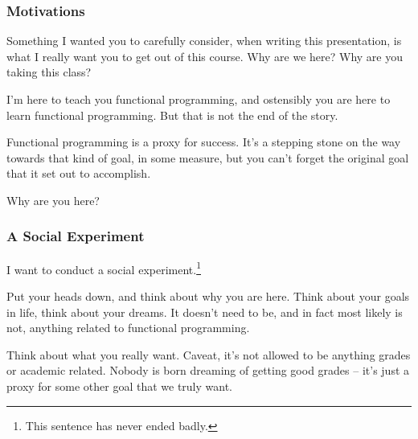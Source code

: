 \documentclass[aspectratio=169, handout]{beamer}
\begin{document}
\begin{frame}[fragile]
  \frametitle{Motivations}

  Something I wanted you to carefully consider, when writing this presentation,
  is what I really want you to get out of this course. Why are we here? Why
  are you taking this class?

  \pause
  \vspace{\fill}

  I'm here to teach you functional programming, and ostensibly you are here
  to learn functional programming. But that is not the end of the story.

  \pause
  \vspace{\fill}

  Functional programming is a proxy for success. It's a stepping stone on the
  way towards that kind of goal, in some measure, but you can't forget the
  original goal that it set out to accomplish.

  \pause
  \vspace{\fill}

  Why are you here?
\end{frame}

\begin{frame}[fragile]
  \frametitle{A Social Experiment}

  I want to conduct a social experiment.\footnote{This sentence has never
  ended badly.}

  \pause
  \vspace{\fill}

  Put your heads down, and think about why you are here. Think about your
  goals in life, think about your dreams. It doesn't need to be, and in fact
  most likely is not, anything related to functional programming.

  \pause
  \vspace{\fill}

  Think about what you really want. Caveat, it's not allowed to be anything
  grades or academic related. Nobody is born dreaming of getting good grades --
  it's just a proxy for some other goal that we truly want.
\end{frame}
\end{document}
